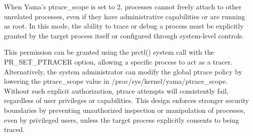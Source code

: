\begin{doublespace}
When Yama’s ptrace\_scope is set to 2, processes cannot freely attach to other unrelated processes, even if they have administrative capabilities or are running as root. In this mode, the ability to trace or debug a process must be explicitly granted by the target process itself or configured through system-level controls.

This permission can be granted using the prctl() system call with the PR\_SET\_PTRACER option, allowing a specific process to act as a tracer. Alternatively, the system administrator can modify the global ptrace policy by lowering the ptrace\_scope value in /proc/sys/kernel/yama/ptrace\_scope. Without such explicit authorization, ptrace attempts will consistently fail, regardless of user privileges or capabilities. This design enforces stronger security boundaries by preventing unauthorized inspection or manipulation of processes, even by privileged users, unless the target process explicitly consents to being traced.

\end{doublespace}